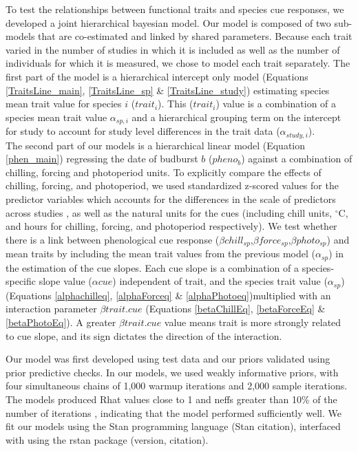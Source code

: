 \documentclass{article}\usepackage[]{graphicx}\usepackage[]{color}
\begin{document}
To test the relationships between functional traits and species cue responses, we developed a joint hierarchical bayesian model. Our model is composed of two sub-models that are co-estimated and linked by shared parameters. Because each trait varied in the number of studies in which it is included as well as the number of individuals for which it is measured, we chose to model each trait separately. The first part of the model is a hierarchical intercept only model (Equations \ref{TraitsLine_main}, \ref{TraitsLine_sp} \& \ref{TraitsLine_study}) estimating species mean trait value for species $i$ ($trait_{i}$). This ($trait_{i}$) value is a combination of a species mean trait value $\alpha_{sp,i}$ and a hierarchical grouping term on the intercept for study to account for study level differences in the trait data ($\alpha_{study,i}$).  \\

The second part of our models is a hierarchical linear model (Equation \ref{phen_main}) regressing the date of budburst $b$  ($pheno_{b}$) against a combination of chilling, forcing and photoperiod units. To explicitly compare the effects of chilling, forcing, and photoperiod, we used standardized z-scored values for the predictor variables which accounts for the differences in the scale of predictors across studies \citep{Gelman2006}, as well as the natural units for the cues (including chill units, $^\circ$C, and hours for chilling, forcing, and photoperiod respectively). We test whether there is a link between phenological cue response ($\beta chill_{sp}$,$\beta force_{sp}$,$\beta photo_{sp}$) and mean traits by including the mean trait values from the previous model ($\alpha_{sp}$) in the estimation of the cue slopes. Each cue slope is a combination of a species-specific slope value ($\alpha cue$) independent of trait, and the species trait value ($\alpha_{sp}$) (Equations \ref{alphachilleq}, \ref{alphaForceq} \& \ref{alphaPhotoeq})multiplied with an interaction parameter $\beta trait.cue$ (Equations \ref{betaChillEq}, \ref{betaForceEq} \& \ref{betaPhotoEq}). A greater $\beta trait.cue$ value means trait is more strongly related to cue slope, and its sign dictates the direction of the interaction. 

Our model was first developed using test data and our priors validated using prior predictive checks. In our models, we used weakly informative priors, with four simultaneous chains of 1,000 warmup iterations and 2,000 sample iterations. The models produced Rhat values close to 1 and neffs greater than 10\% of the number of iterations %
, indicating that the model performed sufficiently well.  We fit our models using the Stan programming language (Stan citation), interfaced with using the rstan package (version, citation).
\end{document}
